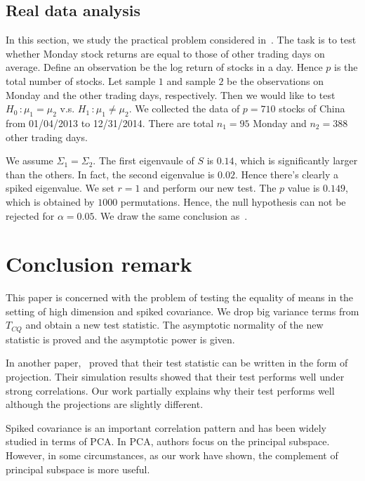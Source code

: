 \documentclass[review]{elsarticle}
\theoremstyle{plain}
\theoremstyle{definition}
\theoremstyle{remark}
\begin{document}
\subsection{Real data analysis}
In this section, we study the practical problem considered in~\cite{Ma2015A}.
The task is to test whether Monday stock returns are equal to those of other trading days on average.
Define an observation be the log return of stocks in a day.
Hence $p$ is the total number of stocks.
Let sample $1$ and sample $2$ be the observations on Monday and the other trading days, respectively.
Then we would like to test $H_0\, :\mu_1=\mu_2$ v.s. $H_1\,:\mu_1\neq \mu_2$.
We collected the data of $p=710$
 stocks of China
from 01/04/2013 to 12/31/2014. There are total $n_1=95$ Monday and $n_2=388$ other trading days. 

We assume $\Sigma_1=\Sigma_2$.
The first eigenvaule of $S$ is $0.14$, which is significantly larger than the others.
In fact, the second eigenvalue is $0.02$.
Hence there's clearly a spiked eigenvalue.
We set $r=1$ and perform our new test.
The $p$ value is $0.149$, which is obtained by $1000$ permutations.
Hence, the null hypothesis can not be rejected for $\alpha=0.05$.
We draw the same conclusion as~\cite{Ma2015A}.

\section{Conclusion remark}

This paper is concerned with the problem of testing the equality of means in the setting of high dimension and spiked covariance. We drop big variance terms from $T_{CQ}$ and obtain a new test statistic. The asymptotic normality of the new statistic is proved and the asymptotic power is given. %

In another paper,~\cite{Zhao2016A} proved that their test statistic can be written in the form of projection. Their simulation results showed that their test performs well under strong correlations.
Our work partially explains why their test performs well although the projections are slightly different. 

 Spiked covariance is an important correlation pattern and has been widely studied in terms of PCA\@.
 In PCA, authors focus on the principal subspace.
 However, in some circumstances, as our work have shown, the complement of principal subspace is more useful. 
\end{document}
